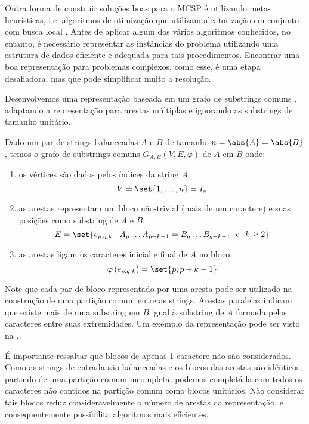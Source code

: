Outra forma de construir soluções boas para o MCSP é utilizando meta-heurísticas, i.e. algoritmos de otimização que utilizam aleatorização em conjunto com busca local \cite[p.~4]{yang_nature-inspired_2010}. Antes de aplicar algum dos vários algoritmos conhecidos, no entanto, é necessário representar as instâncias do problema utilizando uma estrutura de dados eficiente e adequada para tais procedimentos. Encontrar uma boa representação para problemas complexos, como esse, é uma etapa desafiadora, mas que pode simplificar muito a resolução.

Desenvolvemos uma representação baseada em um grafo de substrings comuns \cite{ferdous_solving_2013}, adaptando a representação para arestas múltiplas e ignorando as substrings de tamanho unitário.

\begin{definition}
    Dado um par de strings balanceadas $A$ e $B$ de tamanho $n = \abs{A} = \abs{B}$, temos o grafo de substrings comuns $G_{A,B}(V,E,\varphi)$ de $A$ em $B$ onde:

    \begin{enumerate}[
        label = {\alph*)},
        ref = \thedefinition.\alph*,
        parsep = 0pt,
        itemsep = 0.2em,
        topsep = 0pt
    ]
        \item os vértices são dados pelos índices da string $A$: \[
            V = \set{1, \ldots, n} = I_n
        \]

        \item as arestas representam um bloco não-trivial (mais de um caractere) e suas posições como substring de $A$ e $B$: \[
            E = \set{e_{p, q, k} \mid A_p \ldots A_{p + k - 1} = B_q \ldots B_{q + k - 1} ~\text{ e }~ k \geq 2}
        \]

        \item as arestas ligam os caracteres inicial e final de $A$ no bloco: \[
            \varphi\left(e_{p, q, k}\right) = \set{p, p + k - 1}
        \]
    \end{enumerate}
\end{definition}

Note que cada par de bloco representado por uma aresta pode ser utilizado na construção de uma partição comum entre as strings. Arestas paralelas indicam que existe mais de uma substring em $B$ igual à substring de $A$ formada pelos caracteres entre suas extremidades. Um exemplo da representação pode ser visto na .

É importante ressaltar que blocos de apenas 1 caractere não são considerados. Como as strings de entrada são balanceadas e os blocos das arestas são idênticos, partindo de uma partição comum incompleta, podemos completá-la com todos os caracteres não contidos na partição comum como blocos unitários. Não considerar tais blocos reduz consideravelmente o número de arestas da representação, e consequentemente possibilita algoritmos mais eficientes.

